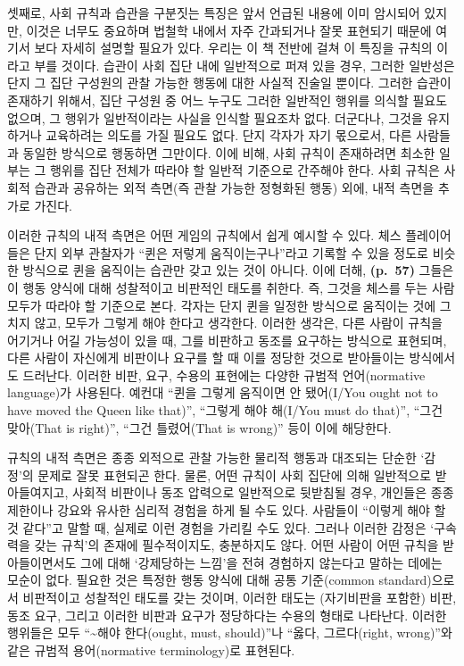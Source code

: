 셋째로, 사회 규칙과 습관을 구분짓는 특징은 앞서 언급된 내용에 이미
암시되어 있지만, 이것은 너무도 중요하며 법철학 내에서 자주 간과되거나
잘못 표현되기 때문에 여기서 보다 자세히 설명할 필요가 있다. 우리는 이 책
전반에 걸쳐 이 특징을 규칙의 이라고
부를 것이다. 습관이 사회 집단 내에 일반적으로 퍼져 있을 경우, 그러한
일반성은 단지 그 집단 구성원의 관찰 가능한 행동에 대한 사실적 진술일
뿐이다. 그러한 습관이 존재하기 위해서, 집단 구성원 중 어느 누구도 그러한
일반적인 행위를 의식할 필요도 없으며, 그 행위가 일반적이라는 사실을
인식할 필요조차 없다. 더군다나, 그것을 유지하거나 교육하려는 의도를 가질
필요도 없다. 단지 각자가 자기 몫으로서, 다른 사람들과 동일한 방식으로
행동하면 그만이다. 이에 비해, 사회 규칙이 존재하려면 최소한 일부는 그
행위를 집단 전체가 따라야 할 일반적 기준으로 간주해야 한다. 사회 규칙은
사회적 습관과 공유하는 외적 측면(즉 관찰 가능한 정형화된 행동) 외에,
내적 측면을 추가로 가진다.

이러한 규칙의 내적 측면은 어떤 게임의 규칙에서 쉽게 예시할 수 있다. 체스
플레이어들은 단지 외부 관찰자가 ``퀸은 저렇게 움직이는구나''라고 기록할
수 있을 정도로 비슷한 방식으로 퀸을 움직이는 습관만 갖고 있는 것이
아니다. 이에 더해, \textbf{(p.~57)} 그들은 이 행동 양식에 대해
성찰적이고 비판적인 태도를 취한다. 즉, 그것을 체스를 두는 사람 모두가
따라야 할 기준으로 본다. 각자는 단지 퀸을 일정한 방식으로 움직이는 것에
그치지 않고, 모두가 그렇게 해야 한다고 생각한다. 이러한 생각은, 다른
사람이 규칙을 어기거나 어길 가능성이 있을 때, 그를 비판하고 동조를
요구하는 방식으로 표현되며, 다른 사람이 자신에게 비판이나 요구를 할 때
이를 정당한 것으로 받아들이는 방식에서도 드러난다. 이러한 비판, 요구,
수용의 표현에는 다양한 규범적 언어(normative language)가 사용된다.
예컨대 ``퀸을 그렇게 움직이면 안 됐어(I/You ought not to have moved the
Queen like that)'', ``그렇게 해야 해(I/You must do that)'', ``그건
맞아(That is right)'', ``그건 틀렸어(That is wrong)'' 등이 이에
해당한다.

규칙의 내적 측면은 종종 외적으로 관찰 가능한 물리적 행동과 대조되는
단순한 `감정'의 문제로 잘못 표현되곤 한다. 물론, 어떤 규칙이 사회 집단에
의해 일반적으로 받아들여지고, 사회적 비판이나 동조 압력으로 일반적으로
뒷받침될 경우, 개인들은 종종 제한이나 강요와 유사한 심리적 경험을 하게
될 수도 있다. 사람들이 ``이렇게 해야 할 것 같다''고 말할 때, 실제로 이런
경험을 가리킬 수도 있다. 그러나 이러한 감정은 `구속력을 갖는 규칙'의
존재에 필수적이지도, 충분하지도 않다. 어떤 사람이 어떤 규칙을
받아들이면서도 그에 대해 `강제당하는 느낌'을 전혀 경험하지 않는다고
말하는 데에는 모순이 없다. 필요한 것은 특정한 행동 양식에 대해 공통
기준(common standard)으로서 비판적이고 성찰적인 태도를 갖는 것이며,
이러한 태도는 (자기비판을 포함한) 비판, 동조 요구, 그리고 이러한 비판과
요구가 정당하다는 수용의 형태로 나타난다. 이러한 행위들은 모두
``\textasciitilde 해야 한다(ought, must, should)''나 ``옳다,
그르다(right, wrong)''와 같은 규범적 용어(normative terminology)로
표현된다.

